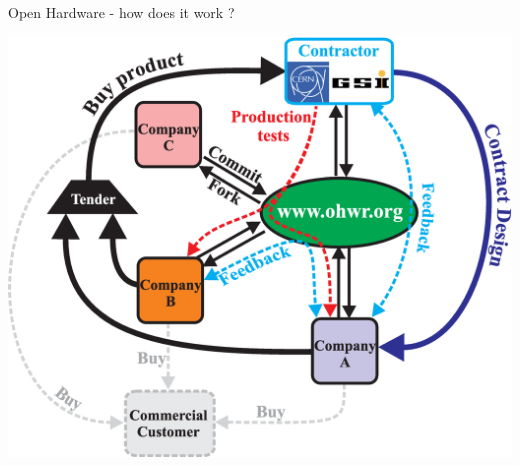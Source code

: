 \documentclass[compress,red]{beamer}
\begin{document}
\begin{frame}{Open Hardware - how does it work ?}

      \begin{center}
	\includegraphics[height=0.8\textheight]{ohwr/openHW.pdf} 
      \end{center}

\end{frame}
\end{document}

